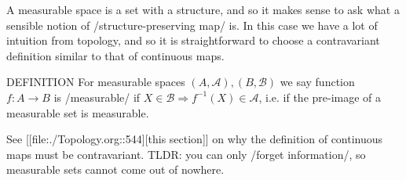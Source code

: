 \documentclass[9pt]{report}
\newtheorem[L]{theorem}{Theorem}[chapter]
\newtheorem[L,nocut]{definition}[theorem]{Definition}
\newtheorem[S,nounderline]{remark}[theorem]{Remarks}
\begin{document}
A measurable space is a set with a structure, and so it makes sense to ask what a sensible notion of /structure-preserving map/ is. In this case we have a lot of intuition from topology, and so it is straightforward to choose a contravariant definition similar to that of continuous maps.

DEFINITION For measurable spaces \((A,\mathcal{A}), (B,\mathcal{B})\) we say function \(f:A \rightarrow B\) is /measurable/ if \(X\in \mathcal{B}\Rightarrow f^{-1}(X)\in \mathcal{A}\), i.e. if the pre-image of a measurable set is measurable.

    See [[file:./Topology.org::544][this section]] on why the definition of continuous maps must be contravariant. TLDR: you can only /forget information/, so measurable sets cannot come out of nowhere.
\end{document}

